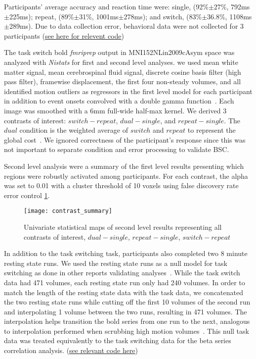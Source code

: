\documentclass[10pt,letterpaper]{article}
\begin{document}
Participants' average accuracy and reaction time were:
single, (92\%$\pm$27\%, 792ms$\pm$225ms); repeat, (89\%$\pm$31\%, 1001ms$\pm$278ms);
and switch, (83\%$\pm$36.8\%, 1108ms$\pm$289ms).
Due to data collection error, behavioral data were not collected for 3 participants
(\href{https://github.com/jdkent/BetaSeriesRealDataAnalysis/blob/90fafb5b83b2e1bfade61a9fb1a87f225efaa95f/summarizeBehavior/summarize_behavior.ipynb}{see here for relevent code})

The task switch bold \emph{fmriprep} output in MNI152NLin2009cAsym space
was analyzed with \emph{Nistats} for first and second level analyses.
we used mean white matter signal, mean cerebrospinal fluid signal,
discrete cosine basis filter (high pass filter), framewise displacement, the first four non-steady volumes, and
all identified motion outliers as regressors in the first level model for each participant
in addition to event onsets convolved with a double gamma function~\cite{Glover1999}.
Each image was smoothed with a 6mm full-wide half-max kernel.
We derived 3 contrasts of interest: $switch - repeat$, $dual- single$, and $repeat - single$.
The $dual$ condition is the weighted average of $switch$ and $repeat$ to represent the global cost~\cite{Wylie2000}.
We ignored correctness of the participant's response since this was not important to
separate condition and error processing to validate BSC.

Second level analysis were a summary of the first level results presenting which
regions were robustly activated among participants.
For each contrast, the alpha was set to 0.01 with a cluster threshold of 10 voxels using
false discovery rate error control \ref{fig:stat_maps}.

\begin{figure}[H]
  \centering
  \texttt{[image: contrast\_summary]}
  \caption{
    Univariate statistical maps of second level results representing
    all contrasts of interest, $dual - single$, $repeat - single$, $switch - repeat$}
  \label{fig:stat_maps}
\end{figure}

In addition to the task switching task, participants also completed
two 8 minute resting state runs.
We used the resting state runs as a null model for task switching as done
in other reports validating analyses~\cite{Eklund2016,Olszowy2019}.
While the task switch data had 471 volumes, each resting state run only had
240 volumes.
In order to match the length of the resting state data with the task data, we concatenated
the two resting state runs while cutting off the first 10 volumes of the second run
and interpolating 1 volume between the two runs, resulting in 471 volumes.
The interpolation helps transition the bold series from one run to the next,
analogous to interpolation performed when scrubbing high motion volumes~\cite{Power2014a}. 
This null task data was treated equivalently to the task switching data for the
beta series correlation analysis.
(\href{https://github.com/jdkent/validateBetaSeries/tree/195ad5b4201971038dbbf8f73a3c537caf032743}{see relevant code here})
\end{document}
